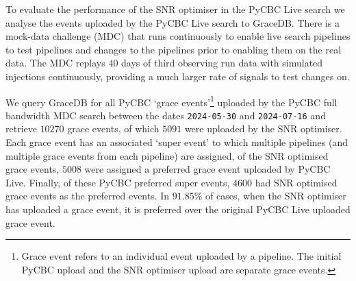 To evaluate the performance of the SNR optimiser in the PyCBC Live search we analyse the events uploaded by the PyCBC Live search to GraceDB. There is a \gwadj mock-data challenge (MDC) that runs continuously to enable live search pipelines to test pipelines and changes to the pipelines prior to enabling them on the real \gwadj data. The MDC replays $40$ days of third observing run \gwadj data with simulated injections continuously, providing a much larger rate of signals to test changes on.

We query GraceDB for all PyCBC `grace events'\footnote{Grace event refers to an individual event uploaded by a pipeline. The initial PyCBC upload and the SNR optimiser upload are separate grace events.} uploaded by the PyCBC full bandwidth MDC search between the dates \texttt{2024-05-30} and \texttt{2024-07-16} and retrieve $10270$ grace events, of which $5091$ were uploaded by the SNR optimiser. Each grace event has an associated `super event' to which multiple pipelines (and multiple grace events from each pipeline) are assigned, of the SNR optimised grace events, $5008$ were assigned a preferred grace event uploaded by PyCBC Live. Finally, of these PyCBC preferred super events, $4600$ had SNR optimised grace events as the preferred events. In $91.85\%$ of cases, when the SNR optimiser has uploaded a grace event, it is preferred over the original PyCBC Live uploaded grace event.

